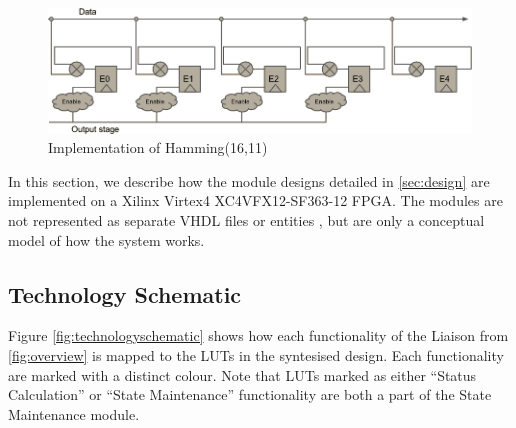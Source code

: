 
\begin{figure}
\includegraphics[width=15cm]{implementation/fig_ecc}
\caption{Implementation of Hamming(16,11)}
\label{fig:ecc}
\end{figure}

In this section, we describe how the module designs detailed in
\autoref{sec:design} are implemented on a Xilinx Virtex4
XC4VFX12-SF363-12 FPGA. The modules are not represented as separate
VHDL files or entities , but are only a conceptual model of how the
system works.

\subsection{Technology Schematic}
\label{sec:technologyschematic}

Figure \autoref{fig:technologyschematic} shows how each functionality
of the Liaison from \autoref{fig:overview} is mapped to the LUTs in
the syntesised design.  Each functionality are marked with a distinct
colour. Note that LUTs marked as either ``Status Calculation'' or
``State Maintenance'' functionality are both a part of the State
Maintenance module.


